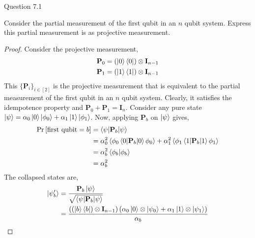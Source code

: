 \begin{solution}{Question 7.1}\label{ques:71}
    \begin{question}
        Consider the partial measurement of the first qubit in an $n$ qubit system. Express this partial measurement is as projective measurement.
    \end{question}
    \tcblower{}
    \begin{proof}
        Consider the projective measurement,
        \begin{equation}
            \begin{split}
                \mathbf{P}_0 = \left(\ket{0}\bra{0}\right)\otimes \mathbf{I}_{n-1}\\
                \mathbf{P}_1 = \left(\ket{1}\bra{1}\right)\otimes \mathbf{I}_{n-1}
            \end{split}
        \end{equation}
        This $\{\mathbf{P}_i\}_{i\in [2]}$ is the projective measurement that is equivalent to the partial measurement of the first qubit in an $n$ qubit system. Clearly, it satisfies the idempotence property and $\mathbf{P}_0 + \mathbf{P}_1 = \mathbf{I}_n$. Consider any pure state $\ket{\psi} = \alpha_0\ket{0}\ket{\phi_0} + \alpha_1\ket{1}\ket{\phi_1}$. Now, applying $\mathbf{P}_b$ on $\ket{\psi}$ gives,
        \begin{equation}
            \begin{split}
                \Pr\left[ \text{first qubit} = b \right] &= \braket{\psi | \mathbf{P}_b | \psi}\\
                                              &= \alpha_0^2\braket{\phi_0\braket{0 | \mathbf{P}_b | 0}\phi_0} + \alpha_1^2\braket{\phi_1\braket{1 | \mathbf{P}_b | 1}\phi_1}\\
                                              &= \alpha_b^2\braket{\phi_b | \phi_b}\\
                                              &= \alpha_b^2\\
            \end{split}
        \end{equation}
        The collapsed states are,
        \begin{equation}
            \begin{split}
                \ket{\psi'_b} &= \frac{\mathbf{P}_b\ket{\psi}}{\sqrt{\braket{\psi | \mathbf{P}_b | \psi}}}\\
                              &= \frac{\left(\left(\ket{b}\bra{b}\right)\otimes \mathbf{I}_{n-1}\right)\left(\alpha_0\ket{0}\otimes\ket{\psi_0} + \alpha_1\ket{1}\otimes\ket{\psi_1}\right)}{\alpha_b}\\

\end{split}
\end{equation}
\end{proof}
\end{solution}
